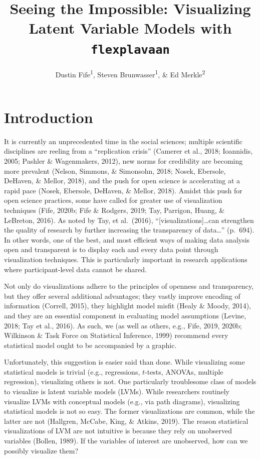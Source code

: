 \documentclass[
  english,
  doc]{apa6}
\title{Seeing the Impossible: Visualizing Latent Variable Models with \texttt{flexplavaan}}
\author{Dustin Fife\textsuperscript{1}, Steven Brunwasser\textsuperscript{1}, \& Ed Merkle\textsuperscript{2}}
\date{}
\affiliation{\vspace{0.5cm}\textsuperscript{1} Rowan University\\\textsuperscript{2} University of Missouri}
\begin{document}
\maketitle

\hypertarget{introduction}{%
\section{Introduction}\label{introduction}}

It is currently an unprecedented time in the social sciences; multiple scientific disciplines are reeling from a ``replication crisis'' (Camerer et al., 2018; Ioannidis, 2005; Pashler \& Wagenmakers, 2012), new norms for credibility are becoming more prevalent (Nelson, Simmons, \& Simonsohn, 2018; Nosek, Ebersole, DeHaven, \& Mellor, 2018), and the push for open science is accelerating at a rapid pace (Nosek, Ebersole, DeHaven, \& Mellor, 2018). Amidst this push for open science practices, some have called for greater use of visualization techniques (Fife, 2020b; Fife \& Rodgers, 2019; Tay, Parrigon, Huang, \& LeBreton, 2016). As noted by Tay, et al.~(2016), ``{[}visualizations{]}\ldots can strengthen the quality of research by further increasing the transparency of data\ldots{}'' (p.~694). In other words, one of the best, and most efficient ways of making data analysis open and transparent is to display each and every data point through visualization techniques. This is particularly important in research applications where participant-level data cannot be shared.

Not only do visualizations adhere to the principles of openness and transparency, but they offer several additional advantages; they vastly improve encoding of information (Correll, 2015), they highlight model misfit (Healy \& Moody, 2014), and they are an essential component in evaluating model assumptions (Levine, 2018; Tay et al., 2016). As such, we (as well as others, e.g., Fife, 2019, 2020b; Wilkinson \& Task Force on Statistical Inference, 1999) recommend every statistical model ought to be accompanied by a graphic.

Unfortunately, this suggestion is easier said than done. While visualizing some statistical models is trivial (e.g., regressions, \(t\)-tests, ANOVAs, multiple regression), visualizing others is not. One particularly troublesome class of models to visualize is latent variable models (LVMs). While researchers routinely visualize LVMs with conceptual models (e.g., via path diagrams), visualizing statistical models is not so easy. The former visualizations are common, while the latter are not (Hallgren, McCabe, King, \& Atkins, 2019). The reason statistical visualizations of LVM are not intuitive is because they rely on unobserved variables (Bollen, 1989). If the variables of interest are unobserved, how can we possibly visualize them?
\end{document}
